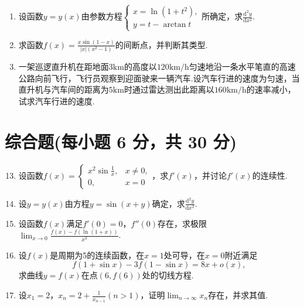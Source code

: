 \documentclass[../main.tex]{subfiles}
\begin{document}
\begin{enumerate}
    \item 设函数$y=y(x)$由参数方程$\begin{cases}
                  x=\ln(1+t^{2}), \\
                  y=t-\arctan t
              \end{cases}$所确定，求$\frac{\mathrm{d}^{2}y}{\mathrm{d}x^{2}}$.
          \vspace{8em}

    \item 求函数$f(x)=\frac{x\sin(1-x)}{|x|(x^{2}-1)}$的间断点，并判断其类型.
          \vspace{7em}

    \item 一架巡逻直升机在距地面$3\mathrm{km}$的高度以$120\mathrm{km/h}$匀速地沿一条水平笔直的高速公路向前飞行，飞行员观察到迎面驶来一辆汽车.设汽车行进的速度为匀速，当直升机与汽车间的距离为$5
              \mathrm{km}$时通过雷达测出此距离以$160\mathrm{km/h}$的速率减小，试求汽车行进的速度.
          \vspace{7em}
\end{enumerate}

\section{综合题(每小题 6 分，共 30 分)}
\begin{enumerate}
    \setcounter{enumi}{12}
    \item 设函数$f(x)=
              \begin{cases}
                  x^{2}\sin\frac{1}{x}, & x\neq0, \\
                  0,                    & x=0
              \end{cases}$，求$f'(x)$，并讨论$f'(x)$的连续性.
          \vspace{8em}

    \item 设$y=y(x)$由方程$y=\sin(x+y)$确定，求$\frac{\mathrm{d}^{2} y}{\mathrm{d}x^{2}}$.
          \vspace{9em}

    \item 设函数$f(x)$满足$f'(0)=0$，$f''(0)$存在，求极限$\lim_{x\to0}\frac{f(x)-f(\ln(1+x))}{x^{3}}$.
          \vspace{9em}

    \item 设$f(x)$是周期为5的连续函数，在$x=1$处可导，在$x=0$附近满足
          \[
              f(1+\sin x)-3f(1-\sin x)=8x+o(x),
          \]
          求曲线$y=f(x)$在点$(6, f(6))$处的切线方程.
          \vspace{10em}

    \item 设$x_{1}=2$，$x_{n}=2+\frac{1}{x_{n-1}}(n>1)$，证明$\lim_{n\to\infty}
              x_{n}$存在，并求其值.
          \vspace{10em}
\end{enumerate}
\end{document}
